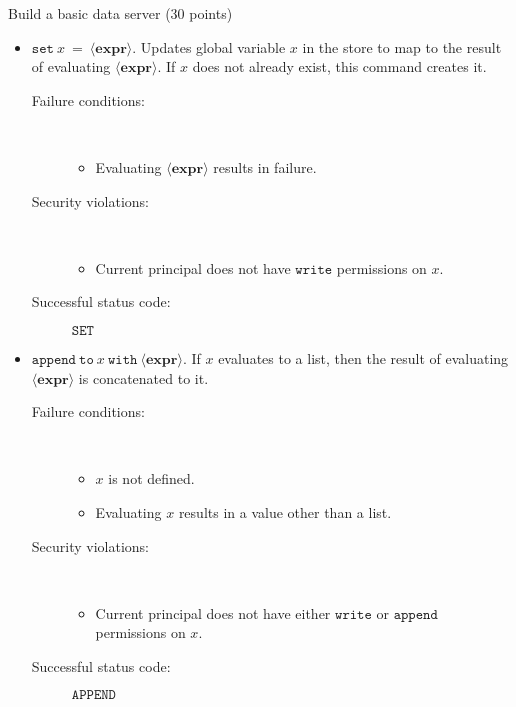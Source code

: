 \documentclass[11pt]{article}
\begin{document}
\begin{problem}{Build a basic data server (30 points)}
\begin{itemize}
\item $\mathtt{set}\ \mathit{x}\ =\ \langle\mathbf{expr}\rangle$. Updates global variable $x$ in the store to map to the result of evaluating $\langle\mathbf{expr}\rangle$. If $x$ does not already exist, this command creates it.
\begin{description}
\item[Failure conditions:]\ \\[-1.5em]
\begin{itemize}
\item Evaluating $\langle\mathbf{expr}\rangle$ results in failure.
\end{itemize}
\item[Security violations:]\ \\[-1.5em]
\begin{itemize}
\item Current principal does not have $\mathtt{write}$ permissions on $x$.
\end{itemize}
\item[Successful status code:] $\mathtt{SET}$
\end{description}

\item $\mathtt{append\ to}\ \mathit{x}\ \mathtt{with}\ \langle\mathbf{expr}\rangle$.
If $x$ evaluates to a list, then the result of evaluating $\langle\mathbf{expr}\rangle$ is concatenated to it.
\begin{description}
\item[Failure conditions:]\ \\[-1.5em]
\begin{itemize}
\item $x$ is not defined.
\item Evaluating $x$ results in a value other than a list.
\end{itemize}
\item[Security violations:]\ \\[-1.5em]
\begin{itemize}
\item Current principal does not have either $\mathtt{write}$ or $\mathtt{append}$ permissions on $x$.
\end{itemize}
\item[Successful status code:] $\mathtt{APPEND}$
\end{description}


\end{itemize}
\end{problem}
\end{document}
